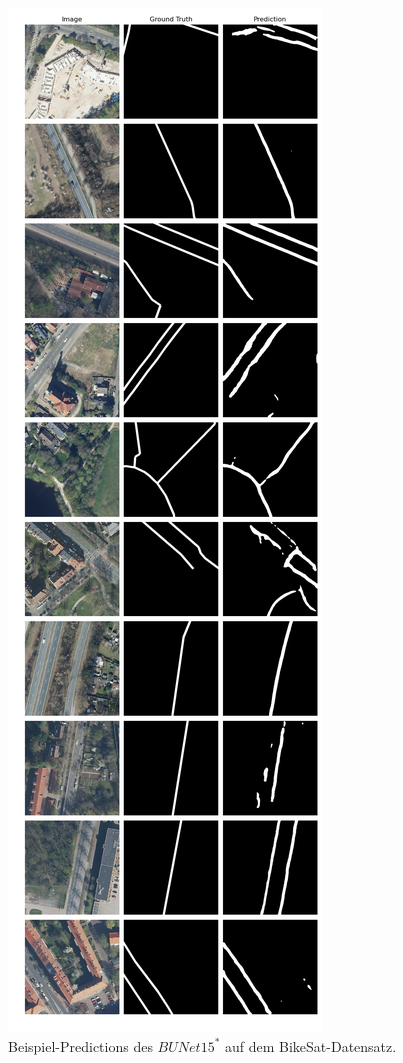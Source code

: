 \begin{figure}
	\centering
	\includegraphics[width=.41\textwidth]{Bilder/Samples-BikeSat/bunet15-s.png} 
	\caption{Beispiel-Predictions des $BUNet15^*$ auf dem BikeSat-Datensatz.}
	\label{fig:bikesat-samples-bunet15-s}
\end{figure}

